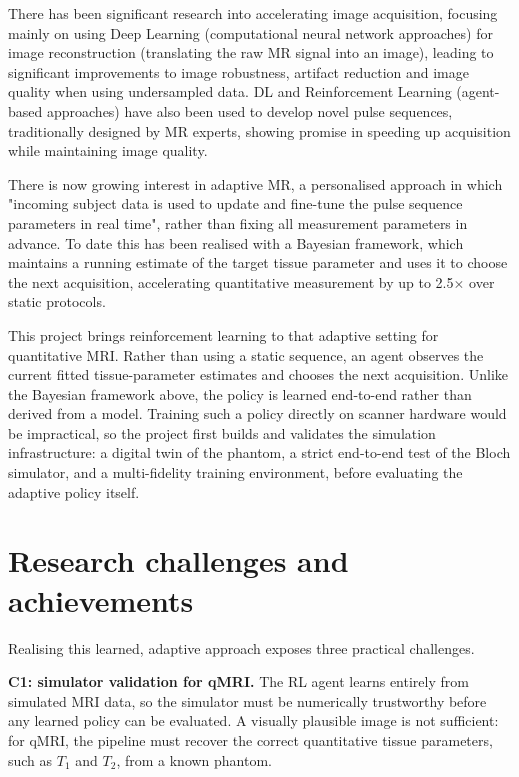 There has been significant research into accelerating image acquisition, focusing mainly on using Deep Learning (computational neural network approaches) for image reconstruction (translating the raw MR signal into an image), leading to significant improvements to image robustness, artifact reduction and image quality when using undersampled data. \cite{DLINMRI:24} DL and Reinforcement Learning (agent-based approaches) have also been used to develop novel pulse sequences, traditionally designed by MR experts, showing promise in speeding up acquisition while maintaining image quality.\cite{zhu2018autoseq,MRISeqSupLearning:21}

There is now growing interest in adaptive MR, a personalised approach in which "incoming subject data is used to update and fine-tune the pulse sequence parameters in real time"\cite{adaptive_mri:23}, rather than fixing all measurement parameters in advance. To date this has been realised with a Bayesian framework, which maintains a running estimate of the target tissue parameter and uses it to choose the next acquisition, accelerating quantitative measurement by up to 2.5$\times$ over static protocols.\cite{adaptive_mri:23}

This project brings reinforcement learning to that adaptive setting for quantitative MRI. Rather than using a static sequence, an agent observes the current fitted tissue-parameter estimates and chooses the next acquisition. Unlike the Bayesian framework above, the policy is learned end-to-end rather than derived from a model. Training such a policy directly on scanner hardware would be impractical, so the project first builds and validates the simulation infrastructure: a digital twin of the phantom, a strict end-to-end test of the Bloch simulator, and a multi-fidelity training environment, before evaluating the adaptive policy itself.

\section{Research challenges and achievements}

Realising this learned, adaptive approach exposes three practical challenges.

\textbf{C1: simulator validation for qMRI.} The RL agent learns entirely from simulated MRI data, so the simulator must be numerically trustworthy before any learned policy can be evaluated. A visually plausible image is not sufficient: for qMRI, the pipeline must recover the correct quantitative tissue parameters, such as \(T_1\) and \(T_2\), from a known phantom.

